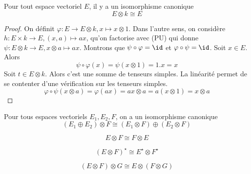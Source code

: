 \begin{prop}
Pour tout espace vectoriel $E$, il y a un isomorphisme canonique  \[
E\otimes k\cong E
\]
\end{prop}

\begin{proof}
    On définit $\varphi:E \longrightarrow E\otimes k, x\longmapsto x\otimes 1$. Dans l'autre sens, on considère $h:E\times k \longrightarrow E, (x, a)\longmapsto ax$, qu'on factorise avec (PU) qui donne $\psi:E\otimes k \longrightarrow E, x\otimes a \longmapsto ax$. Montrons que $\psi\circ \varphi=\id$ et  $\varphi\circ \psi=\id$. Soit  $x \in  E$. Alors \[
        \psi\circ \varphi(x)=\psi(x\otimes 1)=1.x=x
    \]
    Soit $t \in  E\otimes k$. Alors  c'est une somme de tenseurs simples. La linéarité permet de se contenter d'une vérification sur les tenseurs simples. \[
        \varphi\circ \psi(x\otimes a)=\varphi(ax)=ax\otimes a=a(x\otimes 1)=x\otimes a
    \]
\end{proof}

\begin{prop}
Pour tous espaces vectoriels $E_1, E_2, F$, on a un isomorphisme canonique \[
    (E_1\oplus E_2)\otimes F\cong (E_1\otimes F)\oplus(E_2\otimes F)
\] 
\end{prop}

\begin{prop}
 \[
E\otimes F\cong F\otimes E
\] 
\end{prop}

\begin{prop}
\[
    (E\otimes F)^\star \cong E^\star \otimes F^\star
\] 
\end{prop}

\begin{prop}
    \[
        (E\otimes F)\otimes G \cong E\otimes(F\otimes G)
    \] 
\end{prop}
